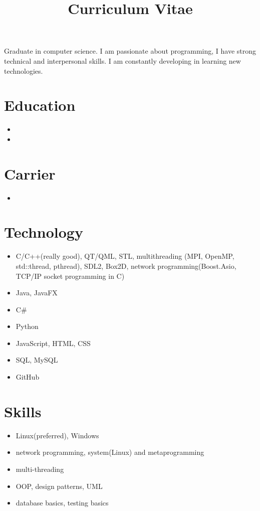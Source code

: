 \documentclass[12pt,a4paper,sans]{moderncv}
\title{Curriculum Vitae}
\begin{document}
\makecvtitle
\small{Graduate in computer science. I am passionate about programming, I have strong technical and interpersonal skills. I am constantly developing in learning new technologies.}

\section{Education}

\begin{itemize}
\item{}
\item{}

\end{itemize}

\section{Carrier}
\begin{itemize}
\item{}

\end{itemize}
\section{Technology}
\begin{itemize}

\item{C/C++(really good), QT/QML, STL, multithreading (MPI, OpenMP, std::thread, pthread), SDL2, Box2D, network programming(Boost.Asio, TCP/IP socket programming in C)}
\item{Java, JavaFX}
\item{C\#}
\item{Python}
\item{JavaScript, HTML, CSS}
\item{SQL, MySQL}
\item{GitHub}
\end{itemize}

\section{Skills}
\begin{itemize}
\item{Linux(preferred), Windows}
\item{network programming, system(Linux) and metaprogramming}
\item{multi-threading}
\item{OOP, design patterns, UML}
\item{database basics, testing basics}
\end{itemize}
\end{document}
